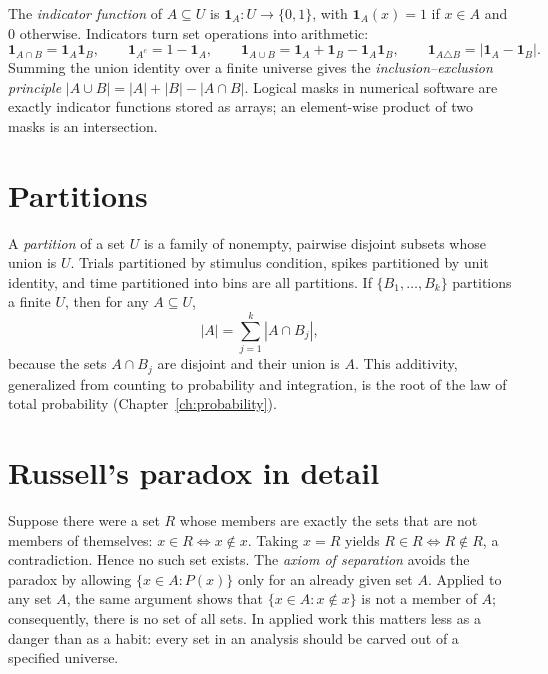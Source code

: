 The \emph{indicator function} of $A\subseteq U$ is $\mathbf 1_A:U\to\{0,1\}$, with $\mathbf 1_A(x)=1$ if $x\in A$ and $0$ otherwise. Indicators turn set operations into arithmetic:
\[
\mathbf 1_{A\cap B}=\mathbf 1_A\mathbf 1_B,\qquad
\mathbf 1_{A^c}=1-\mathbf 1_A,\qquad
\mathbf 1_{A\cup B}=\mathbf 1_A+\mathbf 1_B-\mathbf 1_A\mathbf 1_B,\qquad
\mathbf 1_{A\triangle B}=|\mathbf 1_A-\mathbf 1_B|.
\]
Summing the union identity over a finite universe gives the \emph{inclusion--exclusion principle} $|A\cup B|=|A|+|B|-|A\cap B|$. Logical masks in numerical software are exactly indicator functions stored as arrays; an element-wise product of two masks is an intersection.

\section{Partitions}
A \emph{partition} of a set $U$ is a family of nonempty, pairwise disjoint subsets whose union is $U$. Trials partitioned by stimulus condition, spikes partitioned by unit identity, and time partitioned into bins are all partitions. If $\{B_1,\ldots,B_k\}$ partitions a finite $U$, then for any $A\subseteq U$,
\[
|A|=\sum_{j=1}^k|A\cap B_j|,
\]
because the sets $A\cap B_j$ are disjoint and their union is $A$. This additivity, generalized from counting to probability and integration, is the root of the law of total probability (Chapter~\ref{ch:probability}).

\section{Russell's paradox in detail}
Suppose there were a set $R$ whose members are exactly the sets that are not members of themselves: $x\in R\Leftrightarrow x\notin x$. Taking $x=R$ yields $R\in R\Leftrightarrow R\notin R$, a contradiction. Hence no such set exists. The \emph{axiom of separation} avoids the paradox by allowing $\{x\in A:P(x)\}$ only for an already given set $A$. Applied to any set $A$, the same argument shows that $\{x\in A:x\notin x\}$ is not a member of $A$; consequently, there is no set of all sets. In applied work this matters less as a danger than as a habit: every set in an analysis should be carved out of a specified universe.

